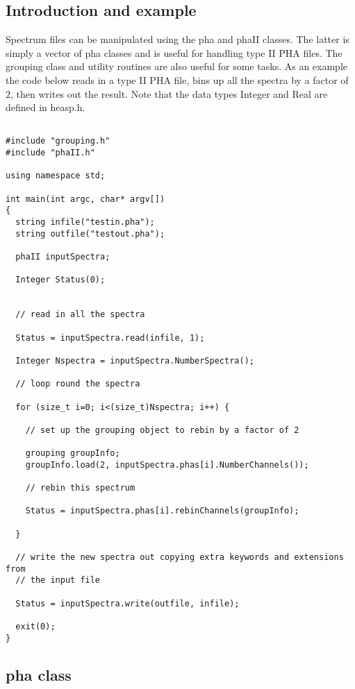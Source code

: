 \documentclass[11pt]{book}
\begin{document}
\subsection{Introduction and example}

Spectrum files can be manipulated using the pha and phaII classes. The
latter is simply a vector of pha classes and is useful for handling
type II PHA files. The grouping class and utility routines are also
useful for some tasks. As an example the code below reads in a type II
PHA file, bins up all the spectra by a factor of 2, then writes out
the result. Note that the data types Integer and Real are defined in heasp.h.

\begin{verbatim}

#include "grouping.h"
#include "phaII.h"

using namespace std;

int main(int argc, char* argv[])
{
  string infile("testin.pha");
  string outfile("testout.pha");

  phaII inputSpectra;

  Integer Status(0);


  // read in all the spectra

  Status = inputSpectra.read(infile, 1);

  Integer Nspectra = inputSpectra.NumberSpectra();

  // loop round the spectra

  for (size_t i=0; i<(size_t)Nspectra; i++) {

    // set up the grouping object to rebin by a factor of 2

    grouping groupInfo;
    groupInfo.load(2, inputSpectra.phas[i].NumberChannels());

    // rebin this spectrum

    Status = inputSpectra.phas[i].rebinChannels(groupInfo);

  }

  // write the new spectra out copying extra keywords and extensions from
  // the input file

  Status = inputSpectra.write(outfile, infile);

  exit(0);
}
\end{verbatim}



\subsection{pha class}
\end{document}

